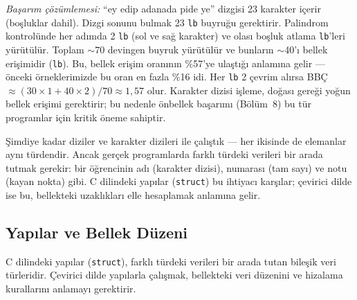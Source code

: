\begin{ornek}[4.11]
\emph{Başarım çözümlemesi:} ``ey edip adanada pide ye'' dizgisi 23 karakter içerir (boşluklar dahil). Dizgi sonunu bulmak 23 \texttt{lb} buyruğu gerektirir. Palindrom kontrolünde her adımda 2 \texttt{lb} (sol ve sağ karakter) ve olası boşluk atlama \texttt{lb}'leri yürütülür. Toplam $\sim$70 devingen buyruk yürütülür ve bunların $\sim$40'ı bellek erişimidir (\texttt{lb}). Bu, bellek erişim oranının \%57'ye ulaştığı anlamına gelir --- önceki örneklerimizde bu oran en fazla \%16 idi. Her \texttt{lb} 2 çevrim alırsa BBÇ~$\approx (30 \times 1 + 40 \times 2) / 70 \approx 1{,}57$ olur. Karakter dizisi işleme, doğası gereği yoğun bellek erişimi gerektirir; bu nedenle önbellek başarımı (Bölüm~8) bu tür programlar için kritik öneme sahiptir.
\end{ornek}


Şimdiye kadar diziler ve karakter dizileri ile çalıştık --- her ikisinde de elemanlar aynı türdendir. Ancak gerçek programlarda farklı türdeki verileri bir arada tutmak gerekir: bir öğrencinin adı (karakter dizisi), numarası (tam sayı) ve notu (kayan nokta) gibi. C dilindeki yapılar (\texttt{struct}) bu ihtiyacı karşılar; çevirici dilde ise bu, bellekteki uzaklıkları elle hesaplamak anlamına gelir.

\subsection{Yapılar ve Bellek Düzeni}
\label{subsec:yapilar}

C dilindeki yapılar (\texttt{struct}), farklı türdeki verileri bir arada tutan bileşik veri türleridir. Çevirici dilde yapılarla çalışmak, bellekteki veri düzenini ve hizalama kurallarını anlamayı gerektirir.

